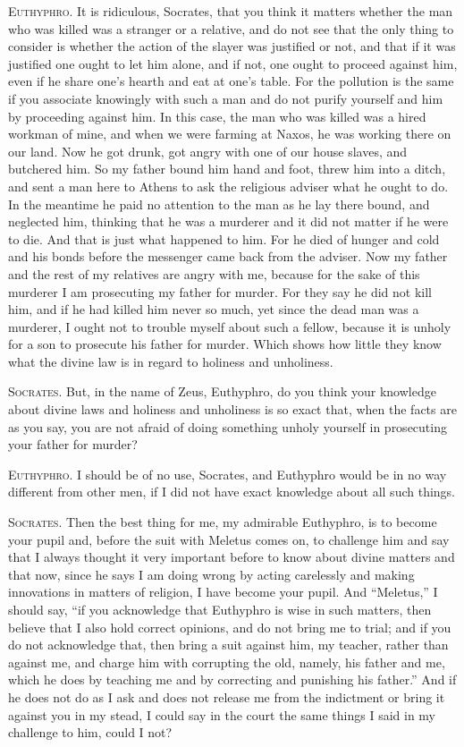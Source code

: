 \textsc{Euthyphro}. It is ridiculous, Socrates, that you think it
matters whether the man who was killed  was a stranger or a
relative, and do not see that the only thing to consider is whether
the action of the slayer was justified or not, and that if it was
justified one ought to let him alone, and if not, one ought to
proceed against him, even if he share one's hearth and eat at one's
table. For the pollution is the same if you associate knowingly with
such a man and do not purify yourself and him by proceeding against
him. In this case, the man who was killed was a hired workman of mine,
and when we were farming at Naxos, he was working there on our land.
Now he got drunk, got angry with one of our house slaves, and
butchered him. So my father bound him hand and foot, threw him into a
ditch, and sent a man here to Athens to ask the religious adviser what
he ought to do. In the meantime he paid no attention to the man as he
lay there bound, and neglected him, thinking that he was a murderer
and it did not matter if he were to die. And that is just what
happened to him. For he died of hunger and cold and his bonds before
the messenger came back from the adviser. Now my father and the rest
of my relatives are angry with me, because for the sake of this
murderer I am prosecuting my father for murder. For they say he did
not kill him, and if he had killed him never so much, yet since the
dead man was a murderer, I ought not to trouble myself about such a
fellow, because it is unholy for a son to prosecute his father for
murder. Which shows how little they know what the divine law is in
regard to holiness and unholiness.

\textsc{Socrates}. But, in the name of Zeus, Euthyphro, do you think
your knowledge about divine laws and  holiness and unholiness
is so exact that, when the facts are as you say, you are not afraid of
doing something unholy yourself in prosecuting your father for
murder?

\textsc{Euthyphro}. I should be of no use, Socrates, and Euthyphro
would be in no way different from other men, if I did not have exact
knowledge about all such things.

\textsc{Socrates}. Then the best thing for me, my admirable Euthyphro,
is to become your pupil and, before the suit with Meletus comes on, to
challenge him and say that I always thought it very important before
to know about divine matters and that now, since he says I am doing
wrong by acting carelessly and making innovations in matters of
religion, I have become your pupil. And ``Meletus,'' I should say,
``if you acknowledge that Euthyphro is wise in such matters, then
believe that I also hold correct opinions, and do not bring me to
trial; and if you do not acknowledge that, then bring a suit against
him, my teacher, rather than against me, and charge him with
corrupting the old, namely, his father and me, which he does by
teaching me and by correcting and punishing his father.'' And if he
does not do as I ask and does not release me from the indictment or
bring it against you in my stead, I could say in the court the same
things I said in my challenge to him, could I not?

